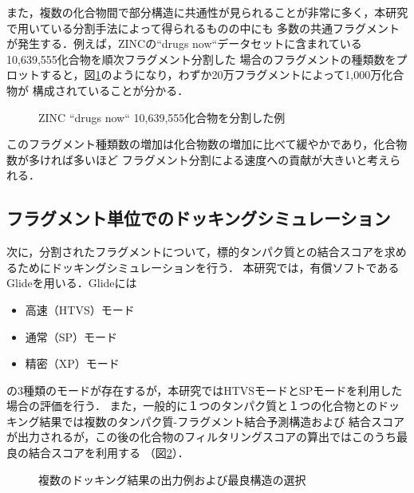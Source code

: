 また，複数の化合物間で部分構造に共通性が見られることが非常に多く，本研究で用いている分割手法によって得られるものの中にも
多数の共通フラグメントが発生する．例えば，ZINCの``drugs now``データセットに含まれている10,639,555化合物を順次フラグメント分割した
場合のフラグメントの種類数をプロットすると，図\ref{fig:decomposition_amount}のようになり，わずか20万フラグメントによって1,000万化合物が
構成されていることが分かる．
\begin{figure}[htp]
 \begin{center}
  \caption{ZINC ``drugs now`` 10,639,555化合物を分割した例}
  \label{fig:decomposition_amount}
 \end{center}
\end{figure}
このフラグメント種類数の増加は化合物数の増加に比べて緩やかであり，化合物数が多ければ多いほど
フラグメント分割による速度への貢献が大きいと考えられる．

\subsection{フラグメント単位でのドッキングシミュレーション}
次に，分割されたフラグメントについて，標的タンパク質との結合スコアを求めるためにドッキングシミュレーションを行う．
本研究では，有償ソフトであるGlide\cite{Friesner2004}を用いる．Glideには
\begin{itemize}
\item 高速（HTVS）モード
\item 通常（SP）モード
\item 精密（XP）モード
\end{itemize}
の3種類のモードが存在するが，本研究ではHTVSモードとSPモードを利用した場合の評価を行う．
また，一般的に１つのタンパク質と１つの化合物とのドッキング結果では複数のタンパク質-フラグメント結合予測構造および
結合スコアが出力されるが，この後の化合物のフィルタリングスコアの算出ではこのうち最良の結合スコアを利用する
（図\ref{fig:fragment_result}）．

\begin{figure}[t]
\begin{minipage}{0.5\hsize}
 \begin{center}
 \end{center}
\end{minipage}
\begin{minipage}{0.5\hsize}
 \begin{center}
 \end{center}
\end{minipage}
 \caption{複数のドッキング結果の出力例および最良構造の選択}
 \label{fig:fragment_result}
\end{figure}

